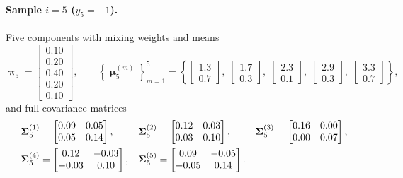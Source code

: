 \documentclass[11pt, letterpaper]{article}
\newcommand{\bSigma}{\vb{\Sigma}}
\newcommand{\bpi}{\boldsymbol{\uppi}}
\newcommand{\bmu}{\boldsymbol{\upmu}}
\begin{document}
\paragraph{Sample $i = 5$ ($y_5 = -1$).} Five components with mixing weights and means
\begin{equation}
    \bpi_5 = \begin{bmatrix} 0.10 \\ 0.20 \\ 0.40 \\ 0.20 \\ 0.10 \end{bmatrix},
    \qquad
    \left\{\bmu_5^{(m)}\right\}_{m=1}^{5} =
    \left\{
        \begin{bmatrix} 1.3 \\ 0.7 \end{bmatrix},\;
        \begin{bmatrix} 1.7 \\ 0.3 \end{bmatrix},\;
        \begin{bmatrix} 2.3 \\ 0.1 \end{bmatrix},\;
        \begin{bmatrix} 2.9 \\ 0.3 \end{bmatrix},\;
        \begin{bmatrix} 3.3 \\ 0.7 \end{bmatrix}
    \right\},
\end{equation}
and full covariance matrices
\begin{align}
    \bSigma_5^{(1)} &= \begin{bmatrix} 0.09 & 0.05 \\ 0.05 & 0.14 \end{bmatrix}, &
    \bSigma_5^{(2)} &= \begin{bmatrix} 0.12 & 0.03 \\ 0.03 & 0.10 \end{bmatrix}, &
    \bSigma_5^{(3)} &= \begin{bmatrix} 0.16 & 0.00 \\ 0.00 & 0.07 \end{bmatrix}, \notag \\
    \bSigma_5^{(4)} &= \begin{bmatrix} 0.12 & -0.03 \\ -0.03 & 0.10 \end{bmatrix}, &
    \bSigma_5^{(5)} &= \begin{bmatrix} 0.09 & -0.05 \\ -0.05 & 0.14 \end{bmatrix}. &&
\end{align}
\end{document}
